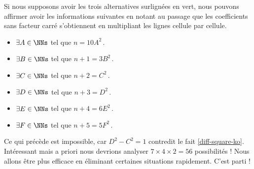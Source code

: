 Si nous supposons avoir les trois alternatives surlignées en vert, nous pouvons affirmer avoir les informations suivantes en notant au passage que les coefficients sans facteur carré s'obtiennent en multipliant les lignes cellule par cellule.%
\vspace{-1ex}
\begin{multicols}{2}
	\begin{itemize}
		\item $\exists A \in \NNs$ tel que $n     = 10 A^2$\,.

		\item $\exists B \in \NNs$ tel que $n + 1 = 3  B^2$\,.

		\item $\exists C \in \NNs$ tel que $n + 2 =    C^2$\,.

		\item $\exists D \in \NNs$ tel que $n + 3 =    D^2$\,.

		\item $\exists E \in \NNs$ tel que $n + 4 = 6  E^2$\,.

		\item $\exists F \in \NNs$ tel que $n + 5 = 5  F^2$\,.
	\end{itemize}
\end{multicols}
\vspace{-1ex}
Ce qui précède est impossible, car $D^2 - C^2 = 1$ contredit le fait \ref{diff-square-ko}.
Intéressant mais a priori nous devrions analyser $7 \times 4 \times 2 = 56$ possibilités ! 
Nous allons être plus efficace en éliminant certaines situations rapidement. C'est parti !
%
